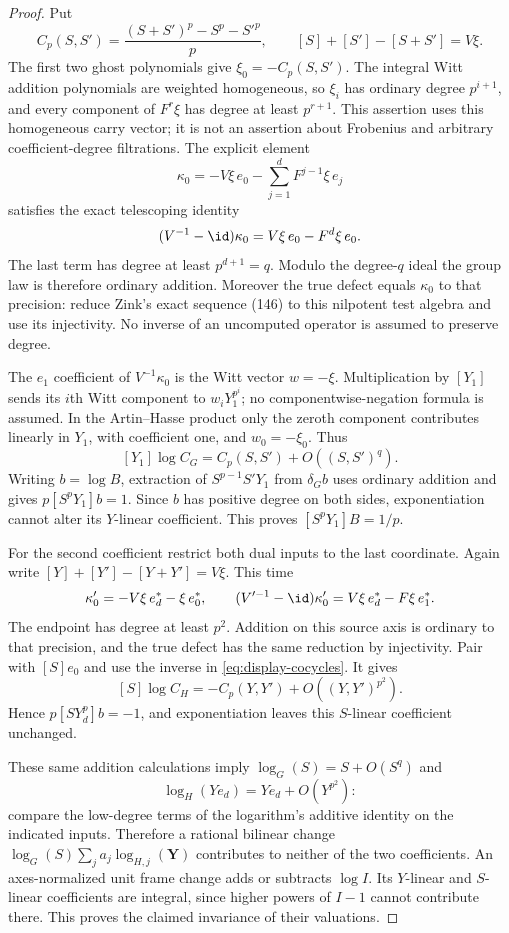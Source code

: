 \begin{proof}
Put
\[
 C_p(S,S')=\frac{(S+S')^p-S^p-S'^p}{p},\qquad
 [S]+[S']-[S+S']=V\xi.
\]
The first two ghost polynomials give $\xi_0=-C_p(S,S')$. The integral Witt addition polynomials are weighted homogeneous, so $\xi_i$ has ordinary degree $p^{i+1}$, and every component of $F^r\xi$ has degree at least $p^{r+1}$. This assertion uses this homogeneous carry vector; it is not an assertion about Frobenius and arbitrary coefficient-degree filtrations. The explicit element
\[
 \kappa_0=-V\xi\,e_0-\sum_{j=1}^dF^{j-1}\xi\,e_j
\]
satisfies the exact telescoping identity
\[
 (V^{-1}-\id)\kappa_0=V\xi\,e_0-F^d\xi\,e_0.
\]
The last term has degree at least $p^{d+1}=q$. Modulo the degree-$q$ ideal the group law is therefore ordinary addition. Moreover the true defect equals $\kappa_0$ to that precision: reduce Zink's exact sequence (146) to this nilpotent test algebra and use its injectivity. No inverse of an uncomputed operator is assumed to preserve degree.

The $e_1$ coefficient of $V^{-1}\kappa_0$ is the Witt vector $w=-\xi$. Multiplication by $[Y_1]$ sends its $i$th Witt component to $w_iY_1^{p^i}$; no componentwise-negation formula is assumed. In the Artin--Hasse product only the zeroth component contributes linearly in $Y_1$, with coefficient one, and $w_0=-\xi_0$. Thus
\[
 [Y_1]\log C_G=C_p(S,S')+O((S,S')^q).
\]
Writing $b=\log B$, extraction of $S^{p-1}S'Y_1$ from $\delta_G b$ uses ordinary addition and gives $p[S^pY_1]b=1$. Since $b$ has positive degree on both sides, exponentiation cannot alter its $Y$-linear coefficient. This proves $[S^pY_1]B=1/p$.

For the second coefficient restrict both dual inputs to the last coordinate. Again write $[Y]+[Y']-[Y+Y']=V\xi$. This time
\[
 \kappa'_0=-V\xi\,e_d^*-\xi\,e_0^*,\qquad
 (V'^{-1}-\id)\kappa'_0=V\xi\,e_d^*-F\xi\,e_1^*.
\]
The endpoint has degree at least $p^2$. Addition on this source axis is ordinary to that precision, and the true defect has the same reduction by injectivity. Pair with $[S]e_0$ and use the inverse in \eqref{eq:display-cocycles}. It gives
\[
 [S]\log C_H=-C_p(Y,Y')+O((Y,Y')^{p^2}).
\]
Hence $p[SY_d^p]b=-1$, and exponentiation leaves this $S$-linear coefficient unchanged.

These same addition calculations imply $\log_G(S)=S+O(S^q)$ and
\[
 \log_H(Ye_d)=Ye_d+O(Y^{p^2}):
\]
compare the low-degree terms of the logarithm's additive identity on the indicated inputs. Therefore a rational bilinear change $\log_G(S)\sum_j a_j\log_{H,j}(\mathbf Y)$ contributes to neither of the two coefficients. An axes-normalized unit frame change adds or subtracts $\log I$. Its $Y$-linear and $S$-linear coefficients are integral, since higher powers of $I-1$ cannot contribute there. This proves the claimed invariance of their valuations.


\end{proof}
